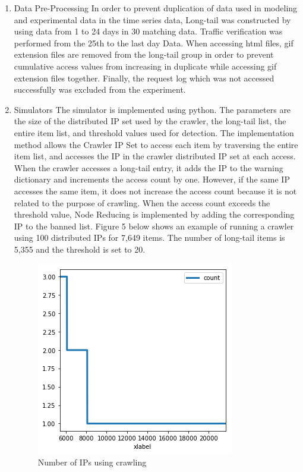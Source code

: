 \documentclass[sigconf,anonymous=false]{acmart}
\begin{document}
\begin{enumerate}
\item Data Pre-Processing
\newline In order to prevent duplication of data used in modeling and experimental data in the time series data, Long-tail was constructed by using data from 1 to 24 days in 30 matching data. Traffic verification was performed from the 25th to the last day Data.
When accessing html files, gif extension files are removed from the long-tail group in order to prevent cumulative access values from increasing in duplicate while accessing gif extension files together.
Finally, the request log which was not accessed successfully was excluded from the experiment.

\item Simulators
\newline 
The simulator is implemented using python. The parameters are the size of the distributed IP set used by the crawler, the long-tail list, the entire item list, and threshold values used for detection.
The implementation method allows the Crawler IP Set to access each item by traversing the entire item list, and accesses the IP in the crawler distributed IP set at each access.
When the crawler accesses a long-tail entry, it adds the IP to the warning dictionary and increments the access count by one. However, if the same IP accesses the same item, it does not increase the access count because it is not related to the purpose of crawling. When the access count exceeds the threshold value, Node Reducing is implemented by adding the corresponding IP to the banned list. Figure 5 below shows an example of running a crawler using 100 distributed IPs for 7,649 items. The number of long-tail items is 5,355 and the threshold is set to 20. 

\begin{figure}[H]
    \includegraphics[width=0.65\columnwidth]{figs/figure_05_td4.png}
    \caption{Number of IPs using crawling}
    \label{fig:my_label}
\end{figure}


\end{enumerate}
\end{document}
